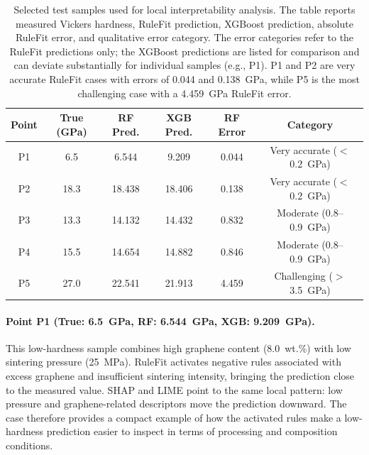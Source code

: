 \documentclass[pdflatex,sn-mathphys-num]{sn-jnl}%
\theoremstyle{thmstyleone}%
\theoremstyle{thmstyletwo}%
\theoremstyle{thmstylethree}%
\begin{document}
\begin{table}[h]
\footnotesize
\centering
\renewcommand{\arraystretch}{1.4}
\caption{Selected test samples used for local interpretability analysis. The table reports measured Vickers hardness, RuleFit prediction, XGBoost prediction, absolute RuleFit error, and qualitative error category. The error categories refer to the RuleFit predictions only; the XGBoost predictions are listed for comparison and can deviate substantially for individual samples (e.g., P1). P1 and P2 are very accurate RuleFit cases with errors of 0.044 and 0.138~GPa, while P5 is the most challenging case with a 4.459~GPa RuleFit error.}
\label{tab:case_overview}
\begin{tabular}{cccccc}
\hline
\textbf{Point} & \textbf{True (GPa)} & \textbf{RF Pred.} & \textbf{XGB Pred.} & \textbf{RF Error} & \textbf{Category} \\ \hline
P1 & 6.5  & 6.544  & 9.209  & 0.044 & Very accurate ($<$0.2~GPa) \\
P2 & 18.3 & 18.438 & 18.406 & 0.138 & Very accurate ($<$0.2~GPa) \\
P3 & 13.3 & 14.132 & 14.432 & 0.832 & Moderate (0.8--0.9~GPa) \\
P4 & 15.5 & 14.654 & 14.882 & 0.846 & Moderate (0.8--0.9~GPa) \\
P5 & 27.0 & 22.541 & 21.913 & 4.459 & Challenging ($>$3.5~GPa) \\
\hline
\end{tabular}
\end{table}
\FloatBarrier

\paragraph{Point P1 (True: 6.5~GPa, RF: 6.544~GPa, XGB: 9.209~GPa).}
This low-hardness sample combines high graphene content (8.0~wt.\%) with low sintering pressure (25~MPa). RuleFit activates negative rules associated with excess graphene and insufficient sintering intensity, bringing the prediction close to the measured value. SHAP and LIME point to the same local pattern: low pressure and graphene-related descriptors move the prediction downward. The case therefore provides a compact example of how the activated rules make a low-hardness prediction easier to inspect in terms of processing and composition conditions.
\end{document}
